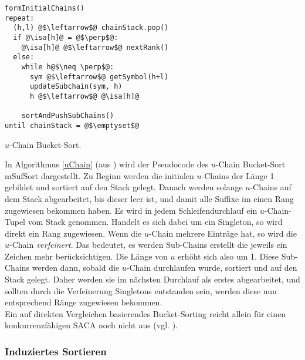 \begin{listing}[htp]
\begin{verbatim}
formInitialChains()
repeat:
  (h,l) @$\leftarrow$@ chainStack.pop()	
  if @\isa[h]@ = @$\perp$@:
    @\isa[h]@ @$\leftarrow$@ nextRank()		
  else:
    while h@$\neq \perp$@:
      sym @$\leftarrow$@ getSymbol(h+l)
      updateSubchain(sym, h)
      h @$\leftarrow$@ @\isa[h]@
    
    sortAndPushSubChains()	
until chainStack = @$\emptyset$@			
\end{verbatim}
\caption{$u$-Chain Bucket-Sort.}
\label{uChain}
\end{listing}

In Algorithmus \ref{uChain} (aus \cite{saca:8}) wird der Pseudocode des $u$-Chain Bucket-Sort mSufSort dargestellt.
Zu Beginn werden die initialen $u$-Chains der Länge 1 gebildet und sortiert auf den Stack gelegt. Danach werden solange $u$-Chains auf dem Stack abgearbeitet, bis dieser leer ist, und damit alle Suffixe im \isa einen Rang zugewiesen bekommen haben.
Es wird in jedem Schleifendurchlauf ein $u$-Chain-Tupel vom Stack genommen. Handelt es sich dabei um ein Singleton, so wird direkt ein Rang zugewiesen. Wenn die $u$-Chain mehrere Einträge hat, so wird die $u$-Chain \textit{verfeinert}. Das bedeutet, es werden Sub-Chains erstellt die jeweils ein Zeichen mehr berücksichtigen. Die Länge von $u$ erhöht sich also um 1. Diese Sub-Chains werden dann, sobald die $u$-Chain durchlaufen wurde, sortiert und auf den Stack gelegt. Daher werden sie im nächsten Durchlauf als erstes abgearbeitet, und sollten durch die Verfeinerung Singletons entstanden sein, werden diese nun entsprechend Ränge zugewiesen bekommen.\\

Ein auf direkten Vergleichen basierendes Bucket-Sorting reicht allein für einen konkurrenzfähigen SACA noch nicht aus (vgl. \cite{seward2000}).

\subsubsection{Induziertes Sortieren}

